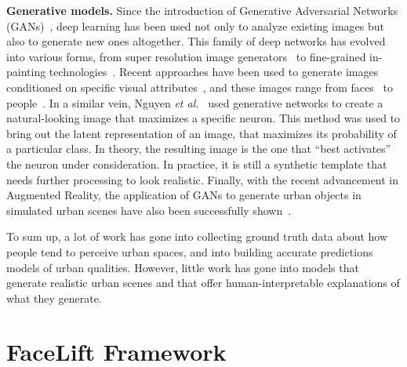 \vspace{4pt}\noindent
\textbf{Generative models.} Since the introduction of Generative Adversarial Networks (GANs)~\cite{goodfellow2014generative}, deep learning has been used not only to analyze existing images but also to generate new ones altogether. This family of deep networks has evolved into various forms, from super resolution image generators~\cite{ledig2017photo} to fine-grained in-painting technologies~\cite{pathak2016context}. Recent approaches have been used to generate images conditioned on specific visual attributes~\cite{yan2015attribute2image}, and these images range from faces~\cite{taigman2016unsupervised} to people~\cite{ma2018disentangled}. In a similar vein, Nguyen \emph{et al.}~\cite{nguyen2016synthesizing} used generative networks to create a natural-looking image that maximizes a specific neuron. This method was used to bring out the latent representation of an image, that maximizes its probability of a particular class. In theory, the resulting image is the one that ``best activates'' the neuron under consideration. In practice, it is still a synthetic template that needs further processing to look realistic.   Finally, with the recent advancement in Augmented Reality, the application of GANs to generate urban objects in simulated urban scenes have also been successfully shown~\cite{alhaija2018augmented}. 

\vspace{4pt}
To sum up, a lot of work has gone into collecting ground truth data about how people tend to perceive urban spaces, and into building accurate predictions models of urban qualities. However,  little work has gone into models that generate realistic urban scenes and that offer human-interpretable explanations of what they generate. 




\section{FaceLift Framework}
\label{sec:framework}

